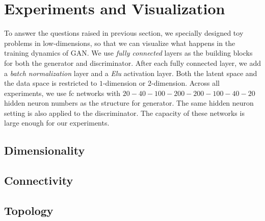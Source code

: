 \section{Experiments and Visualization} \label{sec:exp}

To answer the questions raised in previous section,
we specially designed toy problems in low-dimensions,
so that we can visualize what happens in the training dynamics of GAN.
We use \emph{fully connected} layers as the building blocks for both
the generator and discriminator.
After each fully connected layer,
we add a \emph{batch normalization} layer and a \emph{Elu} activation layer.
Both the latent space and the data space is
restricted to $1$-dimension or $2$-dimension.
Across all experiments,
we use fc networks with
$20-40-100-200-200-100-40-20$ hidden neuron numbers
as the structure for generator.
The same hidden neuron setting is also applied to the discriminator.
The capacity of these networks is large enough for our experiments.

\subsection{Dimensionality}

\subsection{Connectivity}

\subsection{Topology}
